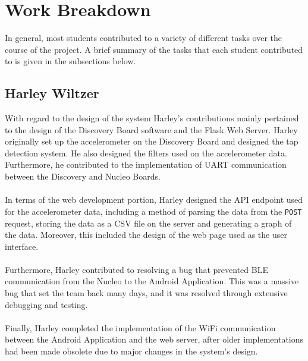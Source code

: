 \section*{Work Breakdown}
In general, most students contributed to a variety of different tasks over the course of the
project. A brief summary of the tasks that each student contributed to is given in the subsections
below.

\subsection*{Harley Wiltzer}
With regard to the design of the system Harley's contributions mainly pertained to the design of the
Discovery Board software and the Flask Web Server. Harley originally set up the accelerometer on the
Discovery Board and designed the tap detection system. He also designed the filters used on the
accelerometer data. Furthermore, he contributed to the
implementation of UART communication between the Discovery and Nucleo Boards.\\\\
In terms of the web development portion, Harley designed the API endpoint used for the accelerometer
data, including a method of parsing the data from the \texttt{POST} request, storing the data as a
CSV file on the server and generating a graph of the data. Moreover, this included the design of the
web page used as the user interface.\\\\
Furthermore, Harley contributed to resolving a bug that prevented BLE communication from the Nucleo
to the Android Application. This was a massive bug that set the team back many days, and it was
resolved through extensive debugging and testing.\\\\
Finally, Harley completed the implementation of the WiFi communication between the Android
Application and the web server, after older implementations had been made obsolete due to major
changes in the system's design.
